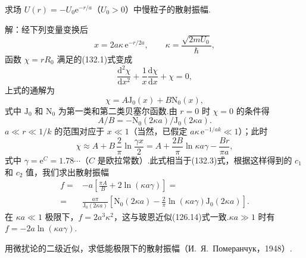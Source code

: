 \begin{xiti}
\quad 求场 $U(r)=-U_0\mathrm{e}^{-r/a}$（$U_0>0$）中慢粒子的散射振幅.

解：经下列变量变换后
\begin{equation*}
  x=2a\kappa\,\mathrm{e}^{-r/2a},\qquad
  \kappa=\frac{\sqrt{2mU_0}}{\hbar},
\end{equation*}
函数 $\chi=rR_0$ 满足的(132.1)式变成
\begin{equation*}
  \frac{\mathrm{d}^2\chi}{\mathrm{d}x^2}
  +\frac{1}{x}\frac{\mathrm{d}\chi}{\mathrm{d}x}+\chi=0,
\end{equation*}
上式的通解为
\begin{equation*}
  \chi=A\mathrm{J}_0(x)+B\mathrm{N}_0(x),
\end{equation*}
式中 $\mathrm{J}_0$ 和 $\mathrm{N}_0$ 为第一类和第二类贝塞尔函数.由 $r=0$ 时 $\chi=0$ 的条件得
\begin{equation*}
  A/B=-\mathrm{N}_0(2\kappa a)/\mathrm{J}_0(2\kappa a).
\end{equation*}
$a\ll r\ll1/k$ 的范围对应于 $x\ll1$（当然，已假定 $a\kappa\,\mathrm{e}^{-1/ak}\ll1$）；此时
\begin{equation*}
  \chi\approx A+B\,\frac{2}{\pi}\ln\frac{\gamma x}{2}
  =A+\frac{2B}{\pi}\ln\kappa a\gamma-\frac{Br}{\pi a},
\end{equation*}
式中 $\gamma=\mathrm{e}^{C}=1.78\cdots$（$C$ 是欧拉常数）.此式相当于(132.3)式，根据这样得到的 $c_1$ 和 $c_2$ 值，我们求出散射振幅
\begin{equation*}
\begin{aligned}
  f={}&-a\left[\frac{\pi A}{B}+2\ln(\kappa a\gamma)\right]=\\
  ={}&\frac{a\pi}{\mathrm{J}_0(2\kappa a)}
  \left[\mathrm{N}_0(2\kappa a)
  -\frac{2}{\pi}\ln(\kappa a\gamma)\mathrm{J}_0(2\kappa a)\right].
\end{aligned}
\end{equation*}
在 $\kappa a\ll1$ 极限下，$f=2a^3\kappa^2$，这与玻恩近似(126.14)式一致.$\kappa a\gg1$ 时有 $f=-2a\ln(\kappa a\gamma)$.

\quad 用微扰论的二级近似，求低能极限下的散射振幅（И.~Я.~Померанчук，1948）.


\end{xiti}
